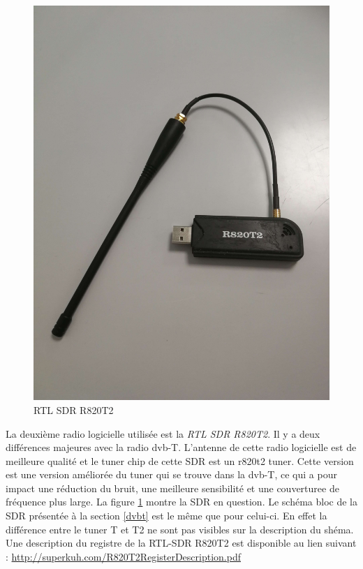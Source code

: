 \begin{figure}[h]
\centering

\includegraphics[scale=0.08]{images/r820t2.png}
\caption{RTL SDR R820T2}\label{term32}
\end{figure}

La deuxième radio logicielle utilisée est la \textit{RTL SDR R820T2}. Il y a deux différences majeures avec la radio dvb-T. L'antenne de cette radio logicielle est de meilleure qualité et le tuner chip de cette SDR est un r820t2 tuner. Cette version est une version améliorée du tuner qui se trouve dans la dvb-T, ce qui a pour impact une réduction du bruit, une meilleure sensibilité et une couverturee de fréquence plus large. La figure \ref{term32} montre la SDR en question. Le schéma bloc de la SDR présentée à la section \ref{dvbt} est le même que pour celui-ci. En effet la différence entre le tuner T et T2 ne sont pas visibles sur la description du shéma. Une description du registre de la RTL-SDR R820T2 est disponible au lien suivant : \href{http://superkuh.com/R820T2_Register_Description.pdf}{http://superkuh.com/R820T2RegisterDescription.pdf}


